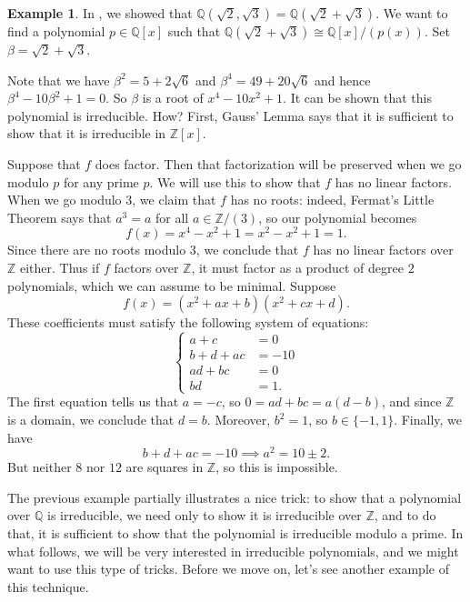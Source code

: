 \documentclass[12pt]{report}
\numberwithin{equation}{section}
\numberwithin{theorem}{chapter}
\theoremstyle{definition}
\newtheorem{example}[theorem]{Example}
\newtheorem*{basic properties}{Basic Properties}
\newtheorem*{Important Remark}{Important Remark}
\newcommand{\Z}{\mathbb{Z}}
\newcommand{\Q}{\mathbb{Q}}
\begin{document}
\begin{example}\label{example irreducible root 2+3}
In , we showed that $\Q(\sqrt{2},\sqrt{3})=\Q(\sqrt{2}+\sqrt{3})$. We want to find a polynomial $p \in \Q[x]$ such that $\Q(\sqrt{2}+\sqrt{3}) \cong \Q[x]/(p(x))$. Set $\beta=\sqrt{2}+\sqrt{3}$.

Note that we have $\beta^2 = 5 + 2 \sqrt{6}$ and $\beta^4 = 49 + 20 \sqrt{6}$ and hence $\beta^4 - 10 \beta^2 + 1 = 0$. So $\beta$ is a root of $x^4 - 10 x^2 + 1$. It can be shown that this polynomial is irreducible. How? First, Gauss' Lemma says that it is sufficient to show that it is irreducible in $\Z[x]$.

Suppose that $f$ does factor. Then that factorization will be preserved when we go modulo $p$ for any prime $p$. We will use this to show that $f$ has no linear factors. When we go modulo $3$, we claim that $f$ has no roots: indeed, Fermat's Little Theorem says that $a^3=a$ for all $a \in \Z/(3)$, so our polynomial becomes
$$f(x) = x^4-x^2+1=x^2-x^2+1=1.$$
Since there are no roots modulo $3$, we conclude that $f$ has no linear factors over $\Z$ either. Thus if $f$ factors over $\Z$, it must factor as a product of degree $2$ polynomials, which we can assume to be minimal. Suppose
$$f(x) = (x^2+ax+b)(x^2+cx+d).$$
These coefficients must satisfy the following system of equations:
$$\left\lbrace
\begin{array}{ll}
	a+c & = 0 \\
	b+d+ac & = -10 \\
	ad+bc & = 0 \\
	bd & = 1 .
\end{array}
\right.$$
The first equation tells us that $a=-c$, so $0 = ad+bc = a(d-b)$, and since $\Z$ is a domain, we conclude that $d=b$. Moreover, $b^2 = 1$, so $b \in \{ -1, 1 \}$. Finally, we have
$$b+d+ac = -10 \implies a^2 = 10 \pm 2.$$
But neither $8$ nor $12$ are squares in $\Z$, so this is impossible.
\end{example}


The previous example partially illustrates a nice trick: to show that a polynomial over $\Q$ is irreducible, we need only to show it is irreducible over $\Z$, and to do that, it is sufficient to show that the polynomial is irreducible modulo a prime. In what follows, we will be very interested in irreducible polynomials, and we might want to use this type of tricks. Before we move on, let's see another example of this technique.
\end{document}
